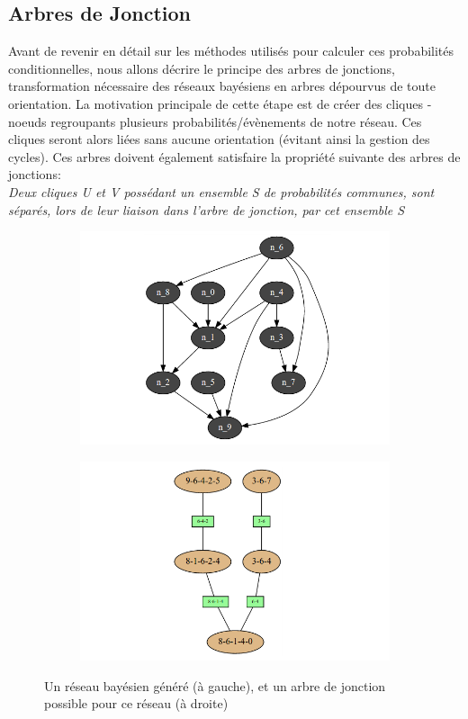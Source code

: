 \documentclass[a4paper]{article}
\begin{document}
 \subsection{Arbres de Jonction}
Avant de revenir en détail sur les méthodes utilisés pour calculer ces probabilités conditionnelles, nous allons décrire le principe des arbres de jonctions, transformation nécessaire des réseaux bayésiens
en arbres dépourvus de toute orientation. La motivation principale de cette étape est de créer des cliques - noeuds regroupants plusieurs probabilités/évènements de notre réseau. Ces cliques seront alors
liées sans aucune orientation (évitant ainsi la gestion des cycles). Ces arbres doivent également satisfaire la propriété suivante des arbres de jonctions: \\
\textit{Deux cliques U et V possédant un ensemble S de probabilités communes, sont séparés, lors de leur liaison dans l'arbre de jonction, par cet ensemble S}
\begin{figure}[h!]
 \centering
 \begin{subfigure}{.5\textwidth}
  \includegraphics[width=\linewidth]{Images/Bayesian_Network.png}
  \label{fig:bng}  
 \end{subfigure}%
\begin{subfigure}{.5\textwidth}
  \includegraphics[width=\linewidth]{Images/Junction_Tree.png}
  \label{fig:jtg}  
 \end{subfigure}
 \caption{Un réseau bayésien généré (à gauche), et un arbre de jonction possible pour ce réseau (à droite)}
\end{figure}
\end{document}
